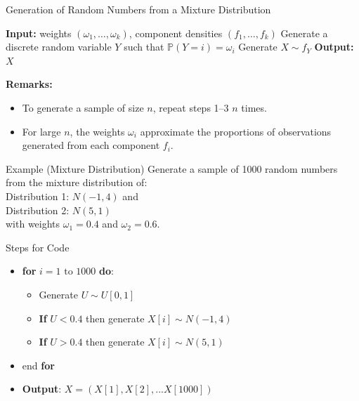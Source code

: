 \documentclass[8pt]{beamer}
\begin{document}
\begin{frame}{Generation of Random Numbers from a Mixture Distribution}
\begin{algorithm}[H]
\caption{Simulation from a Mixture Distribution}\label{alg:mixture}
\begin{algorithmic}[1]
  \State \textbf{Input:} weights $(\omega_1, \dots, \omega_k)$, component densities $(f_1, \dots, f_k)$
  \State Generate a discrete random variable $Y$ such that 
        $\mathbb{P}(Y=i) = \omega_i$
  \State Generate $X \sim f_Y$
  \State \textbf{Output:} $X$
\end{algorithmic}
\end{algorithm}

\vspace{2mm}

\textbf{Remarks:}  
\begin{itemize}
  \item To generate a sample of size $n$, repeat steps 1–3 $n$ times.  
  \item For large $n$, the weights $\omega_i$ approximate the proportions of observations generated from each component $f_i$.  
\end{itemize}
\end{frame}

\begin{frame}{Example (Mixture Distribution)}
Generate a sample of 1000 random numbers from the mixture distribution of:\\
Distribution 1: $N(-1,4)$  and \\
Distribution 2: $N(5,1)$  \\
with weights $\omega_1=0.4$ and $\omega_2=0.6$. \\

\vspace{2mm}

\alert{Steps for Code}
\begin{itemize}
	\item \textbf{for} $i=1 \text{ to } 1000$ \textbf{do}:
		\begin{itemize}
			\item Generate $U \sim U[0,1]$
			\item \textbf{If} $U<0.4$ then generate $X[i] \sim N(-1,4)$
			\item \textbf{If} $U>0.4$ then generate $X[i] \sim N(5,1)$
		\end{itemize}
	\item end \textbf{for}
	\item \textbf{Output}: $X=(X[1],X[2],...X[1000])$
\end{itemize}
\end{frame}
\end{document}

